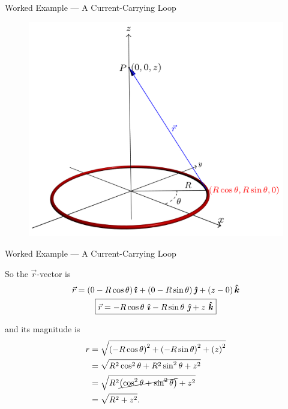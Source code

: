 \documentclass{beamer}
\begin{document}
\begin{frame}{Worked Example --- A Current-Carrying Loop}

\begin{figure}[H]
\centering
\includegraphics[height=0.8\textheight]{figures/loopy_bfield.png}
\end{figure}

\end{frame}

\begin{frame}{Worked Example --- A Current-Carrying Loop}

So the $\vec{r}$-vector is
\begin{gather*}
    \vec{r} = \left( 0 - R\cos{\theta} \right) \ihat + \left( 0 - R\sin{\theta} \right) \jhat + \left( z - 0 \right) \khat \\
    \boxed{\vec{r} = -R\cos{\theta}\ \ihat - R\sin{\theta}\ \jhat + z\ \khat}
\end{gather*}

and its magnitude is
\begin{align*}
    r &= \sqrt{\left( -R\cos{\theta} \right)^2 + \left( -R\sin{\theta} \right)^2 + \left( z \right)^2} \\
      &= \sqrt{R^2 \cos^2{\theta} + R^2 \sin^2{\theta} + z^2} \\
      &= \sqrt{R^2 \cancel{\left( \cos^2{\theta} + \sin^2{\theta} \right)} + z^2} \\
      &= \sqrt{R^2 + z^2}.
\end{align*}

\end{frame}
\end{document}
